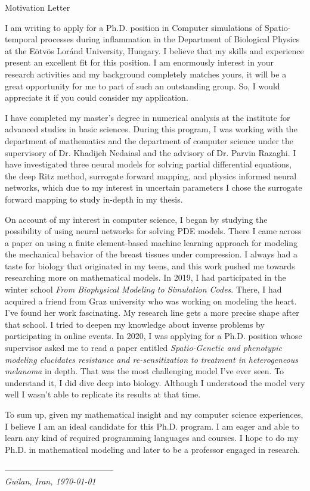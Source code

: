 \begin{cSection}{Motivation Letter}
	\small

I am writing to apply for a Ph.D. position in Computer simulations of Spatio-temporal processes during inflammation in the Department of Biological Physics at the  Eötvös Loránd University, Hungary. I believe that my skills and experience present an excellent fit for this position. I am enormously interest in your research activities and my background completely matches yours, it will be a great opportunity for me to part of such an outstanding group. So, I would appreciate it if you could
consider my application.

I have completed my master's degree in numerical analysis at the institute for advanced studies in basic sciences. During this program, I was working with the department of mathematics and the department of computer science under the supervisory of Dr. Khadijeh Nedaiasl and the advisory of Dr. Parvin Razaghi. I have investigated three neural models for solving partial differential equations, the deep Ritz method, surrogate forward mapping, and physics informed neural networks, which due to my interest in uncertain parameters I chose the surrogate forward mapping to study in-depth in my thesis.

On account of my interest in computer science, I began by studying the possibility of using neural networks for solving PDE models.  There I came across a paper on using a finite element-based machine learning approach for modeling the mechanical behavior of the breast tissues under compression. I always had a taste for biology that originated in my teens, and this work pushed me towards researching more on mathematical models. In 2019, I had participated in the winter school \textit{From Biophysical Modeling to Simulation Codes}. There, I had acquired a friend from Graz university who was working on modeling the heart. I've found her work fascinating. My research line gets a more precise shape after that school.
I tried to deepen my knowledge about inverse problems by participating in online events. In 2020, I was applying for a Ph.D. position whose supervisor asked me to read a paper entitled \textit{Spatio-Genetic and phenotypic modeling elucidates resistance and re-sensitization to treatment in heterogeneous melanoma} in depth. That was the most challenging model I've ever seen.   To understand it, I did dive deep into biology. Although I understood the model very well I wasn't able to replicate its results at that time. 

To sum up, given my mathematical insight and my computer science experiences, I believe I am an ideal candidate for this Ph.D. program. I am eager and able to learn any kind of required programming languages and courses. I hope to do my Ph.D. in mathematical modeling and later to be a professor engaged in research.



	\normalfont
	
	
	---------------------------------------\\
	\tiny\textit{\scriptsize Guilan, Iran, \today}
	\normalsize	
\end{cSection}
